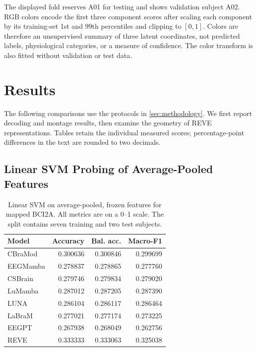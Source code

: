 \documentclass{article}
\begin{document}
The displayed fold reserves A01 for testing and shows validation subject
A02. RGB colors encode the first three component scores after scaling each
component by its training-set 1st and 99th percentiles and clipping to
$[0,1]$. Colors are therefore an unsupervised summary of three latent
coordinates, not predicted labels, physiological categories, or a measure
of confidence. The color transform is also fitted without validation or
test data.



\section{Results}
\label{sec:results}

The following comparisons use the protocols in \cref{sec:methodology}.
We first report decoding and montage results, then examine the geometry
of REVE representations. Tables retain the individual measured scores;
percentage-point differences in the text are rounded to two decimals.

\subsection{Linear SVM Probing of Average-Pooled Features}
\label{sec:svm-probing}

\begin{table}[t]
    \centering
    \caption{Linear SVM on average-pooled, frozen features for mapped BCI2A.
    All metrics are on a 0--1 scale. The split contains seven training and
    two test subjects.}
    \label{tab:svm-results}
    \small
    \setlength{\tabcolsep}{3pt}
    \begin{tabular}{lrrr}
        \toprule
        Model & Accuracy & Bal. acc. & Macro-F1 \\
        \midrule
CBraMod & 0.300636 & 0.300846 & 0.299699 \\
EEGMamba & 0.278837 & 0.278865 & 0.277760 \\
CSBrain & 0.279746 & 0.279834 & 0.279020 \\
LuMamba & 0.287012 & 0.287205 & 0.287390 \\
LUNA & 0.286104 & 0.286117 & 0.286464 \\
LaBraM & 0.277021 & 0.277174 & 0.273225 \\
EEGPT & 0.267938 & 0.268049 & 0.262756 \\
REVE & 0.333333 & 0.333063 & 0.325038 \\
        \bottomrule
    \end{tabular}
\end{table}
\end{document}
